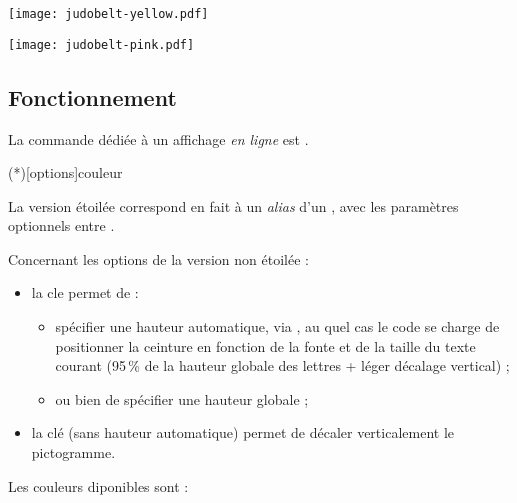 \documentclass[french,11pt,a4paper]{article}
\begin{document}
\begin{demohigh}[language=latex/latex3,style/main=cyan!10,style/code=cyan!10,style/demo=cyan!10]
\texttt{[image: judobelt-yellow.pdf]}\par
\texttt{[image: judobelt-pink.pdf]}
\end{demohigh}

\subsection{Fonctionnement}

La commande dédiée à un affichage \textit{en ligne} est .

\begin{codehigh}[language=latex/latex2,style/main=cyan!10,style/code=cyan!10]
\CeintureCouleur(*)[options]{couleur}
\end{codehigh}

La version étoilée correspond en fait à un \textit{alias} d'un , avec les paramètres optionnels entre \MontreCode{[...]}.

\medskip

Concernant les options de la version non étoilée :

\begin{itemize}[leftmargin=*]
	\item la cle  permet de :
	\begin{itemize}
		\item spécifier une hauteur automatique, via , au quel cas le code se charge de positionner la ceinture en fonction de la fonte et de la taille du texte courant (95\,\% de la hauteur globale des lettres + léger décalage vertical) ;
		\item ou bien de spécifier une hauteur globale ;
	\end{itemize}
	\item la clé  (sans hauteur automatique) permet de décaler verticalement le pictogramme.
\end{itemize}

Les couleurs diponibles sont :
\end{document}
